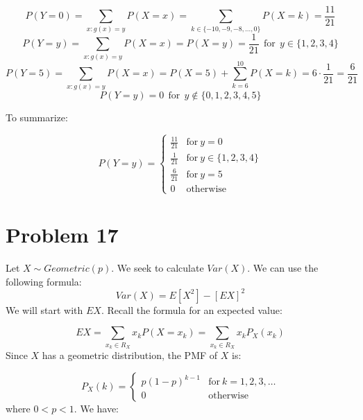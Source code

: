 \documentclass{article}
\begin{document}
\begin{equation*}
    P(Y=0) = \sum_{x:g(x) = y}P(X = x) = \sum_{k \in \{-10, -9, -8, \dots, 0\}}P(X=k) = \frac{11}{21} 
\end{equation*}
\begin{equation*}
    P(Y=y) = \sum_{x:g(x) = y}P(X = x) = P(X=y) = \frac{1}{21} \ \ \text{for} \ \ y \in \{1, 2, 3, 4\}
\end{equation*}
\begin{equation*}
    P(Y=5) = \sum_{x:g(x) = y}P(X = x) = P(X=5) + \sum_{k=6}^{10}P(X=k) = 6 \cdot \frac{1}{21} = \frac{6}{21}
\end{equation*}
\begin{equation*}
    P(Y=y) = 0 \ \ \text{for} \ \ y \notin \{0, 1, 2, 3, 4, 5\}
\end{equation*}

To summarize:

\begin{equation*}
    P(Y = y) =
    \begin{cases}
        \frac{11}{21} & \mbox{for} \ y = 0 \\
        \frac{1}{21}  & \mbox{for} \ y \in \{1, 2, 3, 4\} \\
        \frac{6}{21}  & \mbox{for} \ y = 5 \\
        0 & \mbox{otherwise} 
    \end{cases}
\end{equation*}


\section*{Problem 17}

Let \(X \sim Geometric(p)\). We seek to calculate \(Var(X)\). We can use the following formula:
\begin{equation*}
    Var(X) = E[X^{2}] - [EX]^{2}
\end{equation*}
We will start with \(EX\). Recall the formula for an expected value:

\begin{equation*}
    EX = \sum_{x_{k} \in R_{X}} x_{k}P(X = x_{k}) = \sum_{x_{k} \in R_{X}}x_{k}P_{X}(x_k)
\end{equation*}
Since \(X\) has a geometric distribution, the PMF of \(X\) is:

\begin{equation*}
    P_{X}(k) =
    \begin{cases}
        p(1 - p)^{k-1} & \mbox{for} \ k = 1, 2, 3, \dots \\
        0 & \mbox{otherwise} 
    \end{cases}
\end{equation*}
where \(0 < p < 1\). We have:
\end{document}
